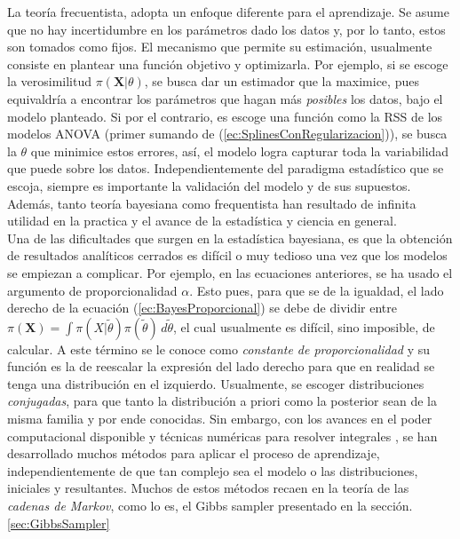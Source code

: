 \documentclass[../Main/Main.tex]{subfiles}
\begin{document}
La teoría frecuentista, adopta un enfoque diferente para el  aprendizaje. Se asume que no hay incertidumbre en los parámetros dado los datos y, por lo tanto, estos son tomados como fijos. El mecanismo que permite su estimación, usualmente consiste en plantear una función objetivo y optimizarla. Por ejemplo, si se escoge la verosimilitud $\pi(\mathbf{X}|\theta)$, se busca dar un estimador que la maximice, pues equivaldría a encontrar los parámetros que hagan más \textit{posibles} los datos, bajo el modelo planteado. Si por el contrario, es escoge una función como la RSS de los modelos ANOVA (primer sumando de (\ref{ec:SplinesConRegularizacion})), se busca la $\theta$ que minimice estos errores, así, el modelo logra capturar toda la variabilidad que puede sobre los datos. Independientemente del paradigma estadístico que se escoja, siempre es importante la validación del modelo y de sus supuestos. Además, tanto teoría bayesiana como frequentista han resultado de infinita utilidad en la practica y el avance de la estadística y ciencia en general. \\

Una de las dificultades que surgen en la estadística bayesiana, es que la obtención de resultados analíticos cerrados es difícil o muy tedioso una vez que los modelos se empiezan a complicar. Por ejemplo, en las ecuaciones anteriores, se ha usado el argumento de proporcionalidad $\alpha$. Esto pues, para que se de la igualdad, el lado derecho de la ecuación (\ref{ec:BayesProporcional}) se debe de dividir entre $\pi(\mathbf{X}) = \int \pi(X|\tilde{\theta})\pi(\tilde{\theta})\,d\tilde{\theta}$, el cual usualmente es difícil, sino imposible, de calcular. A este término se le conoce como \textit{constante de proporcionalidad} y su función es la de reescalar la expresión del lado derecho para que en realidad se tenga una distribución en el izquierdo. Usualmente, se escoger distribuciones \textit{conjugadas}, para que tanto la distribución a priori como la posterior sean de la misma familia y por ende conocidas. Sin embargo, con los avances en el poder computacional disponible y técnicas numéricas para resolver integrales \autocite{robert2004monte}, se han desarrollado muchos métodos para aplicar el proceso de aprendizaje, independientemente de que tan complejo sea el modelo o las distribuciones, iniciales y resultantes. Muchos de estos métodos recaen en la teoría de las \textit{cadenas de Markov}, como lo es, el Gibbs sampler presentado en la sección. \ref{sec:GibbsSampler} 
\end{document}
